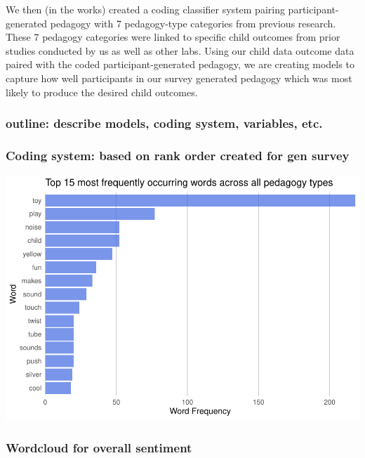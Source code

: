 \documentclass[
  english,
  man]{apa6}
\begin{document}
We then (in the works) created a coding classifier system pairing participant-generated pedagogy with 7 pedagogy-type categories from previous research. These 7 pedagogy categories were linked to specific child outcomes from prior studies conducted by us as well as other labs. Using our child data outcome data paired with the coded participant-generated pedagogy, we are creating models to capture how well participants in our survey generated pedagogy which was most likely to produce the desired child outcomes.

\hypertarget{outline-describe-models-coding-system-variables-etc.}{%
\subsubsection{outline: describe models, coding system, variables, etc.}\label{outline-describe-models-coding-system-variables-etc.}}

\hypertarget{coding-system-based-on-rank-order-created-for-gen-survey}{%
\subsubsection{Coding system: based on rank order created for gen survey}\label{coding-system-based-on-rank-order-created-for-gen-survey}}

\includegraphics{capstone640_files/figure-latex/initial plots-1.pdf}

\hypertarget{wordcloud-for-overall-sentiment}{%
\subsubsection{Wordcloud for overall sentiment}\label{wordcloud-for-overall-sentiment}}
\end{document}
